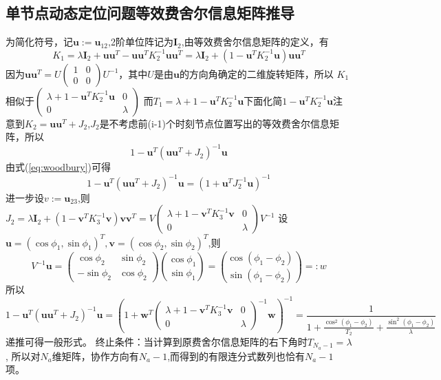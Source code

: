 \subsection{单节点动态定位问题等效费舍尔信息矩阵推导}\label{B_F_1}
为简化符号，记$\bm{u}:=\bm{u}_{12}$,2阶单位阵记为$\bm{I}_2$,由等效费舍尔信息矩阵的定义，有
\begin{equation}\label{eq:initial_efim}
  K_1=\lambda \bm{I}_2+\bm{u}\bm{u}^T-\bm{u}\bm{u}^T K_2^{-1}\bm{u}\bm{u}^T
  =\lambda \bm{I}_2+(1-\bm{u}^T K_2^{-1}\bm{u})\bm{u}\bm{u}^T
\end{equation}
因为$\bm{u}\bm{u}^T=U\begin{pmatrix}
                     1 & 0 \\
                     0 & 0
                   \end{pmatrix}U^{-1}$，其中$U$是由$\bm{u}$的方向角确定的二维旋转矩阵，所以
$K_1$相似于$\begin{pmatrix}
                           \lambda+1-\bm{u}^T K_2^{-1}\bm{u} & 0 \\
                           0 & \lambda
                         \end{pmatrix}$
而$T_1=\lambda+1-\bm{u}^T K_2^{-1}\bm{u}$下面化简$1-\bm{u}^T K_2^{-1}\bm{u}$注意到$K_2=\bm{u}\bm{u}^T+J_2$,$J_2$是不考虑前(i-1)个时刻节点位置写出的等效费舍尔信息矩阵，所以
\[
1-\bm{u}^T (\bm{u}\bm{u}^T+J_2)^{-1}\bm{u}
\]
由式(\ref{eq:woodbury})可得
\begin{equation}
1-\bm{u}^T (\bm{u}\bm{u}^T+J_2)^{-1}\bm{u}
=(1+\bm{u}^T J_2^{-1}\bm{u})^{-1}
\end{equation}
进一步设$v:=\bm{u}_{23}$,则$J_2=\lambda \bm{I}_2+(1-\bm{v}^T K_3^{-1}\bm{v})\bm{v}\bm{v}^T=V\begin{pmatrix}
                     \lambda+1-\bm{v}^T K_3^{-1}\bm{v} & 0 \\
                     0 & \lambda
                   \end{pmatrix}V^{-1}$
设$\bm{u}=(\cos\phi_1,\sin\phi_1)^T,\bm{v}=(\cos\phi_2,\sin\phi_2)^T$,则
\[
V^{-1}\bm{u}=\begin{pmatrix}
                     \cos\phi_2 & \sin\phi_2 \\
                     -\sin\phi_2 & \cos\phi_2
                   \end{pmatrix}\binom{\cos\phi_1}{\sin\phi_1}=\binom{\cos(\phi_1-\phi_2)}{\sin(\phi_1-\phi_2)}=:w
\]
所以
\[
1-\bm{u}^T (\bm{u}\bm{u}^T+J_2)^{-1}\bm{u}=(1+\bm{w}^T \begin{pmatrix}
                     \lambda+1-\bm{v}^T K_3^{-1}\bm{v} & 0 \\
                     0 & \lambda
                   \end{pmatrix}^{-1}\bm{w})^{-1}
                   =\frac{1}{1+\frac{\cos^2(\phi_1-\phi_2)}{T_2}+\frac{\sin^2(\phi_1-\phi_2)}{\lambda}}
\]
递推可得一般形式。
终止条件：当计算到原费舍尔信息矩阵的右下角时$T_{N_a-1}=\lambda$,
所以对$N_a$维矩阵，协作方向有$N_a-1$,而得到的有限连分式数列也恰有$N_a-1$项。
